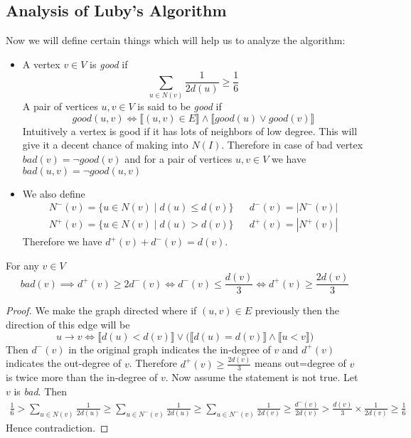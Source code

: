 \subsection{Analysis of Luby's Algorithm}
Now we will define certain things which will help us to analyze the algorithm: 
\begin{itemize}
	\item A vertex $ v\in V$ is \textit{good} if $$\sum_{u\in N(v)}\frac{1}{2d(u)}\geq \frac16$$A pair of vertices $u,v\in V$ is said to be \textit{good} if $$good(u,v)\iff \llbracket(u,v)\in E\rrbracket\wedge\llbracket good(u)\vee good(v)\rrbracket$$Intuitively a vertex is good if it has lots of neighbors of low degree. This will give it a decent chance of making into $N(I)$. Therefore in case of bad vertex $bad(v)=\neg good(v)$ and for a pair of vertices $u,v\in V$ we have $bad(u,v)=\neg good(u,v)$
	
	
	\item We also define \begin{align*}
		N^-(v)=\{u\in N(v)\mid d(u)\leq d(v)\} && d^-(v)=|N^-(v)|\\
		N^+(v)=\{u\in N(v)\mid d(u)>d(v)\} && d^+(v)=|N^+(v)|
	\end{align*}
Therefore we have $d^+(v)+d^-(v)=d(v)$.
\end{itemize}


\begin{lemma}\label{badv}
	For any $v\in V$	$$bad(v)\implies d^+(v)\geq 2d^-(v)\iff  d^-(v)\leq \frac{d(v)}{3}\iff d^+(v)\geq \frac{2d(v)}{3}$$
\end{lemma}
\begin{proof}
	We make the graph directed where if $(u,v)\in E$ previously then the direction of this edge will be $$u\to v\iff \llbracket d(u)<d(v)\rrbracket \vee \Big(\llbracket d(u)=d(v)\rrbracket\wedge \llbracket u<v\rrbracket\Big)$$ Then $d^-(v)$ in the original graph indicates the in-degree of $v$ and $d^+(v)$ indicates the out-degree of $v$. Therefore $d^+(v)\geq \frac{2d(v)}{3}$ means out=degree of $v$ is twice more than the in-degree of $v$. Now assume the statement is not true. Let $v$ is \textit{bad}. Then\begin{align*}
		\frac16 > \sum_{u\in N(v)}\frac{1}{2d(u)}\geq \sum_{u\in N^-(v)}\frac1{2d(u)}\geq \sum_{u\in N^-(v)}\frac1{2d(v)}\geq \frac{d^{-}(v)}{2d(v)}>\frac{d(v)}3\times \frac{1}{2d(v)}\geq \frac16
	\end{align*}Hence contradiction.
\end{proof}

